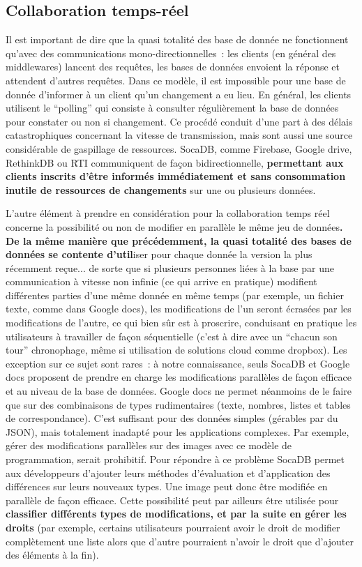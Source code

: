 \documentclass[a4paper,10pt]{scrreprt}
\begin{document}
        
        \subsection{Collaboration temps-réel}
        
            Il est important de dire que la quasi totalité des base de donnée ne fonctionnent qu'avec des communications mono-directionnelles~: les clients (en général des middlewares) lancent des requêtes, les bases de données envoient la réponse et attendent d'autres requêtes. Dans ce modèle, il est impossible pour une base de donnée d'informer à un client qu'un changement a eu lieu. En général, les clients utilisent le ``polling'' qui consiste à consulter régulièrement la base de données pour constater ou non si changement. Ce procédé conduit d'une part à des délais catastrophiques concernant la vitesse de transmission, mais sont aussi une source considérable de gaspillage de ressources. SocaDB, comme Firebase, Google drive, RethinkDB ou RTI communiquent de façon bidirectionnelle, \textbf{permettant aux clients inscrits d'être informés immédiatement et sans consommation inutile de ressources de changements} sur une ou plusieurs données.
            
            L'autre élément à prendre en considération pour la collaboration temps réel concerne la possibilité ou non de modifier en parallèle le même jeu de données\textbf{. De la même manière que précédemment, la quasi totalité des bases de données se contente d'util}iser pour chaque donnée la version la plus récemment reçue... de sorte que si plusieurs personnes liées à la base par une communication à vitesse non infinie (ce qui arrive en pratique) modifient différentes parties d'une même donnée en même temps (par exemple, un fichier texte, comme dans Google docs), les modifications de l'un seront écrasées par les modifications de l'autre, ce qui bien sûr est à proscrire, conduisant en pratique les utilisateurs à travailler de façon séquentielle (c'est à dire avec un ``chacun son tour'' chronophage, même si utilisation de solutions cloud comme dropbox). Les exception sur ce sujet sont rares~: à notre connaissance, seuls SocaDB et Google docs proposent de prendre en charge les modifications parallèles de façon efficace et au niveau de la base de données. Google docs ne permet néanmoins de le faire que sur des combinaisons de types rudimentaires (texte, nombres, listes et tables de correspondance). C'est suffisant pour des données simples (gérables par du JSON), mais totalement inadapté pour les applications complexes. Par exemple, gérer des modifications parallèles sur des images avec ce modèle de programmation, serait prohibitif. Pour répondre à ce problème SocaDB permet aux développeurs d'ajouter leurs méthodes d'évaluation et d'application des différences sur leurs nouveaux types. Une image peut donc être modifiée en parallèle de façon efficace. Cette possibilité peut par ailleurs être utilisée pour \textbf{classifier différents types de modifications, et par la suite en gérer les droits} (par exemple, certains utilisateurs pourraient avoir le droit de modifier complètement une liste alors que d'autre pourraient n'avoir le droit que d'ajouter des éléments à la fin).
        
\end{document}
